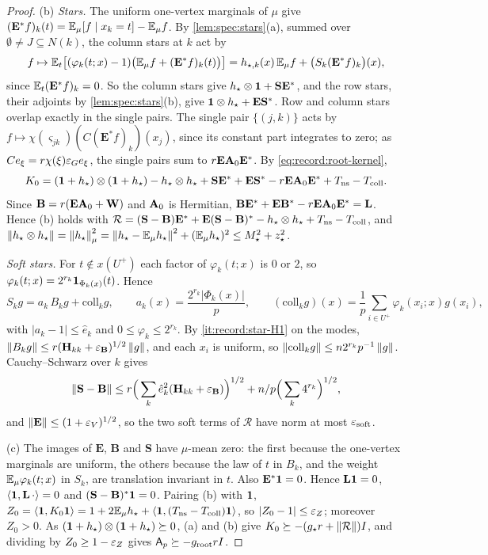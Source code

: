 \begin{proof}
(b) \emph{Stars.} The uniform one-vertex marginals of $\mu$ give
$(\mathbf E^*f)_k(t)=\mathbb E_\mu[f\mid x_k=t]-\mathbb E_\mu f$. By \cref{lem:spec:stars}(a), summed
over $\emptyset\ne J\subseteq N(k)$, the column stars at $k$ act by
\[
  f\mapsto\mathbb E_t\big[(\varphi_k(t;x)-1)\big(\mathbb E_\mu f+(\mathbf E^*f)_k(t)\big)\big]
  =h_{\star,k}(x)\,\mathbb E_\mu f+\big(S_k(\mathbf E^*f)_k\big)(x),
\]
since $\mathbb E_t(\mathbf E^*f)_k=0$. So the column stars give $h_\star\otimes\mathbf 1+\mathbf S\mathbf E^*$,
and the row stars, their adjoints by \cref{lem:spec:stars}(b), give
$\mathbf 1\otimes h_\star+\mathbf E\mathbf S^*$. Row and column stars overlap exactly in the
single pairs. The single pair $\{(j,k)\}$ acts by
$f\mapsto\chi(\varsigma_{jk})(C(\mathbf E^*f)_k)(x_j)$, since its constant part integrates to
zero; as $Ce_\xi=r\chi(\xi)\varepsilon_Ge_\xi$, the single pairs sum to $r\mathbf E\mathbf A_{0}\mathbf E^*$. By
\eqref{eq:record:root-kernel},
\[
  K_0=(\mathbf 1+h_\star)\otimes(\mathbf 1+h_\star)-h_\star\otimes h_\star+\mathbf S\mathbf E^*+\mathbf E\mathbf S^*
  -r\mathbf E\mathbf A_{0}\mathbf E^*+T_{\rm ns}-T_{\rm coll}.
\]
Since $\mathbf B=r(\mathbf E\mathbf A_{0}+\mathbf W)$ and $\mathbf A_{0}$ is Hermitian,
$\mathbf B\mathbf E^*+\mathbf E\mathbf B^*-r\mathbf E\mathbf A_{0}\mathbf E^*=\mathbf L$. Hence (b) holds with
$\mathcal R=(\mathbf S-\mathbf B)\mathbf E^*+\mathbf E(\mathbf S-\mathbf B)^*-h_\star\otimes h_\star+T_{\rm ns}-T_{\rm coll}$,
and $\left\|h_\star\otimes h_\star\right\|=\left\|h_\star\right\|^2_\mu=\left\|h_\star-\mathbb E_\mu h_\star\right\|^2+(\mathbb E_\mu h_\star)^2\le
M_\star^2+z_\star^2$.

\emph{Soft stars.} For $t\notin x(U^+)$ each factor of $\varphi_k(t;x)$ is $0$ or $2$, so
$\varphi_k(t;x)=2^{r_k}\mathbf 1_{\Phi_k(x)}(t)$. Hence
\[
  S_kg=a_k\,B_kg+\mathrm{coll}_kg,\qquad a_k(x)=\frac{2^{r_k}|\Phi_k(x)|}p,\qquad
  (\mathrm{coll}_kg)(x)=\frac1p\sum_{i\in U^+}\varphi_k(x_i;x)g(x_i),
\]
with $|a_k-1|\le\hat e_k$ and $0\le\varphi_k\le2^{r_k}$. By \ref{it:record:star-H1} on the
modes, $\left\|B_kg\right\|\le r(\mathbf H_{kk}+\varepsilon_{\mathbf B})^{1/2}\left\|g\right\|$, and each $x_i$ is uniform,
so $\left\|\mathrm{coll}_kg\right\|\le n2^{r_k}p^{-1}\left\|g\right\|$. Cauchy--Schwarz over $k$ gives
\[
  \left\|\mathbf S-\mathbf B\right\|\le r\Big(\sum_k\hat e_k^2(\mathbf H_{kk}+\varepsilon_{\mathbf B})\Big)^{1/2}
  +n/p\Big(\sum_k4^{r_k}\Big)^{1/2},
\]
and $\left\|\mathbf E\right\|\le(1+\varepsilon_V)^{1/2}$, so the two soft terms of $\mathcal R$ have norm at most
$\varepsilon_{\rm soft}$.

(c) The images of $\mathbf E$, $\mathbf B$ and $\mathbf S$ have $\mu$-mean zero: the first because
the one-vertex marginals are uniform, the others because the law of $t$ in $B_k$,
and the weight $\mathbb E_\mu\varphi_k(t;x)$ in $S_k$, are translation invariant in $t$. Also
$\mathbf E^*\mathbf 1=0$. Hence $\mathbf L\mathbf 1=0$, $\left\langle \mathbf 1,\mathbf L\,\cdot\right\rangle=0$ and
$(\mathbf S-\mathbf B)^*\mathbf 1=0$. Pairing (b) with $\mathbf 1$,
$Z_0=\left\langle \mathbf 1,K_0\mathbf 1\right\rangle=1+2\mathbb E_\mu h_\star+\left\langle \mathbf 1,(T_{\rm ns}-T_{\rm coll})\mathbf 1\right\rangle$, so
$|Z_0-1|\le\varepsilon_Z$; moreover $Z_0>0$. As $(\mathbf 1+h_\star)\otimes(\mathbf 1+h_\star)\succeq0$, (a) and
(b) give $K_0\succeq-(g_\star r+\left\|\mathcal R\right\|)I$, and dividing by $Z_0\ge1-\varepsilon_Z$ gives
$\mathsf A_p\succeq-g_{\rm root}rI$.


\end{proof}
